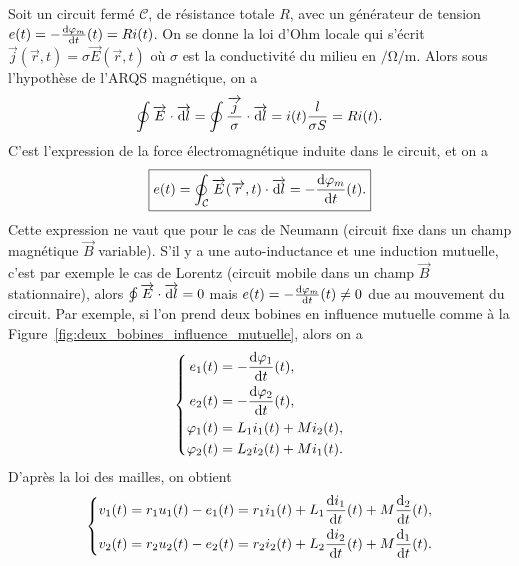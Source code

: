 Soit un circuit fermé $\mathcal{C}$, de résistance totale $R$, avec un générateur de tension $e(t)=-\frac{\mathrm{d}\varphi_m}{\mathrm{d} t}(t)=Ri(t)$. On se donne la loi d'Ohm locale qui s'écrit $\vec{j}(\vec{r},t)=\sigma\vec{E}(\vec{r},t)$ où $\sigma$ est la conductivité du milieu en $\si{\per\ohm\per\metre}$. Alors sous l'hypothèse de l'ARQS magnétique, on a 
\begin{equation*}
    \oint\protect\overrightarrow{{E}}\cdot\protect\overrightarrow{{\mathrm{d} l}}=\oint\frac{\protect\overrightarrow{{j}}}{\sigma}\cdot\protect\overrightarrow{{\mathrm{d} l}}=i(t)\frac{l}{\sigma S}=Ri(t).
\end{equation*}
C'est l'expression de la force électromagnétique induite dans le circuit, et on a
\begin{equation*}
    \boxed{
        e(t)=\oint_{\mathcal{C}}\protect\overrightarrow{{E}}(\protect\overrightarrow{{r}},t)\cdot\protect\overrightarrow{{\mathrm{d} l}}=-\frac{\mathrm{d}\varphi_m}{\mathrm{d} t}(t).
    }
\end{equation*}
Cette expression ne vaut que pour le cas de Neumann (circuit fixe dans un champ magnétique $\vec{B}$ variable). S'il y a une auto-inductance et une induction mutuelle, c'est par exemple le cas de Lorentz (circuit mobile dans un champ $\vec{B}$ stationnaire), alors $\oint\protect\overrightarrow{{E}}\cdot\protect\overrightarrow{{\mathrm{d} l}}=0$ mais $e(t)=-\frac{\mathrm{d}\varphi_m}{\mathrm{d} t}(t)\neq0$ due au mouvement du circuit.
Par exemple, si l'on prend deux bobines en influence mutuelle comme à la Figure~\ref{fig:deux_bobines_influence_mutuelle}, alors on a 
\begin{equation*}
    \left\lbrace
        \begin{aligned}
            e_1(t)&=-\frac{\mathrm{d}\varphi_1}{\mathrm{d} t}(t),\\
            e_2(t)&=-\frac{\mathrm{d}\varphi_2}{\mathrm{d} t}(t),\\
            \varphi_1(t)&=L_1 i_1(t)+Mi_2(t),\\
            \varphi_2(t)&=L_2 i_2(t)+Mi_1(t).
        \end{aligned}
    \right.
\end{equation*}
D'après la loi des mailles, on obtient
\begin{equation*}
    \left\lbrace
        \begin{aligned}
            v_1(t)&=r_1 u_1(t)-e_1(t)=r_1 i_1(t)+L_1\frac{\mathrm{d} i_1}{\mathrm{d} t}(t)+M\frac{\mathrm{d} _2}{\mathrm{d} t}(t),\\
            v_2(t)&=r_2 u_2(t)-e_2(t)=r_2 i_2(t)+L_2\frac{\mathrm{d} i_2}{\mathrm{d} t}(t)+M\frac{\mathrm{d} _1}{\mathrm{d} t}(t).
        \end{aligned}
    \right.
\end{equation*}
